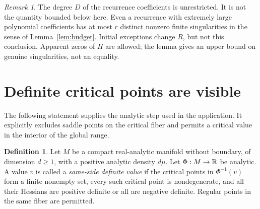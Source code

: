 \documentclass[11pt,a4paper]{article}
\theoremstyle{definition}\newtheorem{definition}[theorem]{Definition}
\theoremstyle{remark}\newtheorem{remark}[theorem]{Remark}
\begin{document}
\begin{remark}
The degree $D$ of the recurrence coefficients is unrestricted. It is not the
quantity bounded below here. Even a recurrence with extremely large polynomial
coefficients has at most $r$ distinct nonzero finite singularities in the sense
of Lemma~\ref{lem:budget}. Initial exceptions change $R$, but not this conclusion.
Apparent zeros of $H$ are allowed; the lemma gives an upper bound on genuine
singularities, not an equality.
\end{remark}

\section{Definite critical points are visible}\label{sec:visibility}
The following statement supplies the analytic step used in the application.
It explicitly excludes saddle points on the critical fiber and permits a
critical value in the interior of the global range.

\begin{definition}
Let $M$ be a compact real-analytic manifold without boundary, of dimension
$d\ge1$, with a positive analytic density $d\mu$. Let $\Phi:M\to\mathbb R$ be analytic.
A value $v$ is called a \emph{same-side definite value} if the critical points
in $\Phi^{-1}(v)$ form a finite nonempty set, every such critical point is
nondegenerate, and all their Hessians are positive definite or all are negative
definite. Regular points in the same fiber are permitted.
\end{definition}
\end{document}
